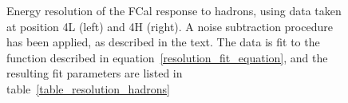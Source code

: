 %
%


\begin{figure}[!htb]
\begin{center}
\end{center}
\caption{Energy resolution of the FCal response to hadrons, using data taken at position 4L (left) and 4H (right). A noise subtraction procedure has been applied, as described in the text. The data is fit to the function described in equation~\ref{resolution_fit_equation}, and the resulting fit parameters are listed in table~\ref{table_resolution_hadrons}}
\label{TBplot_hadron_resolution}
\end{figure}





